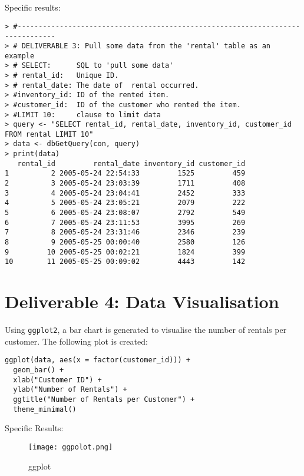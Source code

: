 \documentclass[a4paper,11pt]{extarticle}
\begin{document}
Specific results:
\begin{verbatim}
> #-------------------------------------------------------------------------------
> # DELIVERABLE 3: Pull some data from the 'rental' table as an example
> # SELECT:      SQL to 'pull some data' 
> # rental_id:   Unique ID.
> # rental_date: The date of  rental occurred.
> #inventory_id: ID of the rented item.
> #customer_id:  ID of the customer who rented the item.
> #LIMIT 10:     clause to limit data
> query <- "SELECT rental_id, rental_date, inventory_id, customer_id FROM rental LIMIT 10"
> data <- dbGetQuery(con, query)
> print(data)
   rental_id         rental_date inventory_id customer_id
1          2 2005-05-24 22:54:33         1525         459
2          3 2005-05-24 23:03:39         1711         408
3          4 2005-05-24 23:04:41         2452         333
4          5 2005-05-24 23:05:21         2079         222
5          6 2005-05-24 23:08:07         2792         549
6          7 2005-05-24 23:11:53         3995         269
7          8 2005-05-24 23:31:46         2346         239
8          9 2005-05-25 00:00:40         2580         126
9         10 2005-05-25 00:02:21         1824         399
10        11 2005-05-25 00:09:02         4443         142
\end{verbatim}

\section*{Deliverable 4: Data Visualisation}
Using \texttt{ggplot2}, a bar chart is generated to visualise the number of rentals per customer. The following plot is created:
\begin{verbatim}
ggplot(data, aes(x = factor(customer_id))) +
  geom_bar() +
  xlab("Customer ID") +
  ylab("Number of Rentals") +
  ggtitle("Number of Rentals per Customer") +
  theme_minimal()
\end{verbatim}
Specific Results:
\begin{figure}[H]
    \centering
    \texttt{[image: ggpolot.png]}
    \caption{ggplot}
    \label{fig:ggplot}
\end{figure}
\end{document}
